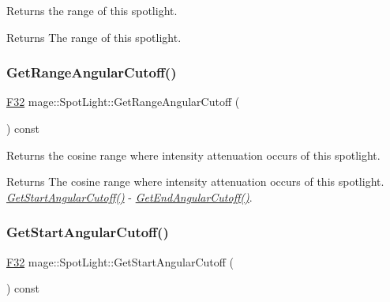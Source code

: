 Returns the range of this spotlight.

\begin{DoxyReturn}{Returns}
The range of this spotlight. 
\end{DoxyReturn}
\hypertarget{classmage_1_1_spot_light_ada7b32eb18cc2bb6707a62c4ab72f4f2}{}\label{classmage_1_1_spot_light_ada7b32eb18cc2bb6707a62c4ab72f4f2} 
\subsubsection{\texorpdfstring{Get\+Range\+Angular\+Cutoff()}{GetRangeAngularCutoff()}}
{\footnotesize\ttfamily \hyperlink{namespacemage_aa97e833b45f06d60a0a9c4fc22ae02c0}{F32} mage\+::\+Spot\+Light\+::\+Get\+Range\+Angular\+Cutoff (\begin{DoxyParamCaption}{ }\end{DoxyParamCaption}) const\hspace{0.3cm}{\ttfamily [noexcept]}}

Returns the cosine range where intensity attenuation occurs of this spotlight.

\begin{DoxyReturn}{Returns}
The cosine range where intensity attenuation occurs of this spotlight. {\itshape \hyperlink{classmage_1_1_spot_light_a649e84aaf1f98c605f14d9597241df72}{Get\+Start\+Angular\+Cutoff()}} -\/ {\itshape \hyperlink{classmage_1_1_spot_light_ad9c4cabf950619605a8040e41b9acb5b}{Get\+End\+Angular\+Cutoff()}}. 
\end{DoxyReturn}
\hypertarget{classmage_1_1_spot_light_a649e84aaf1f98c605f14d9597241df72}{}\label{classmage_1_1_spot_light_a649e84aaf1f98c605f14d9597241df72} 
\subsubsection{\texorpdfstring{Get\+Start\+Angular\+Cutoff()}{GetStartAngularCutoff()}}
{\footnotesize\ttfamily \hyperlink{namespacemage_aa97e833b45f06d60a0a9c4fc22ae02c0}{F32} mage\+::\+Spot\+Light\+::\+Get\+Start\+Angular\+Cutoff (\begin{DoxyParamCaption}{ }\end{DoxyParamCaption}) const\hspace{0.3cm}{\ttfamily [noexcept]}}


